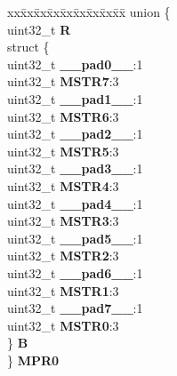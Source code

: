 \begin{DoxyCompactItemize}
\begin{tabbing}
\end{tabbing}\item 
\mbox{\label{structXBAR__tag_a174cc3c8d9a76209efc8a8b94f9865df}} 
\begin{tabbing}
xx\=xx\=xx\=xx\=xx\=xx\=xx\=xx\=xx\=\kill
union \{\\
\>uint32\_t {\bfseries R}\\
\>struct \{\\
\>\>uint32\_t {\bfseries \_\_pad0\_\_}:1\\
\>\>uint32\_t {\bfseries MSTR7}:3\\
\>\>uint32\_t {\bfseries \_\_pad1\_\_}:1\\
\>\>uint32\_t {\bfseries MSTR6}:3\\
\>\>uint32\_t {\bfseries \_\_pad2\_\_}:1\\
\>\>uint32\_t {\bfseries MSTR5}:3\\
\>\>uint32\_t {\bfseries \_\_pad3\_\_}:1\\
\>\>uint32\_t {\bfseries MSTR4}:3\\
\>\>uint32\_t {\bfseries \_\_pad4\_\_}:1\\
\>\>uint32\_t {\bfseries MSTR3}:3\\
\>\>uint32\_t {\bfseries \_\_pad5\_\_}:1\\
\>\>uint32\_t {\bfseries MSTR2}:3\\
\>\>uint32\_t {\bfseries \_\_pad6\_\_}:1\\
\>\>uint32\_t {\bfseries MSTR1}:3\\
\>\>uint32\_t {\bfseries \_\_pad7\_\_}:1\\
\>\>uint32\_t {\bfseries MSTR0}:3\\
\>\} {\bfseries B}\\
\} {\bfseries MPR0}\\


\end{tabbing}
\end{DoxyCompactItemize}
